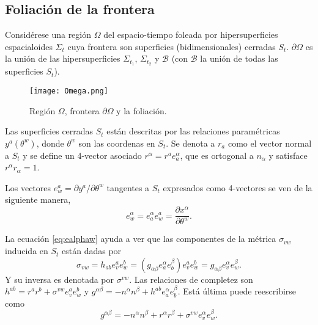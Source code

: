 
\subsection{Foliaci\'{o}n de la frontera}
\label{subsec:foliacionfrontera}

Consid\'{e}rese una regi\'{o}n $\Omega$ del espacio-tiempo foleada por hipersuperficies espacialoides $\Sigma_{t}$ cuya frontera son superficies (bidimensionales) cerradas $S_{t}$. $\partial \Omega$ es la uni\'{o}n de las hipersuperficies $\Sigma_{t_{1}}$, $\Sigma_{t_{2}}$ y $\mathcal{B}$ (con $\mathcal{B}$ la uni\'{o}n de todas las superficies $S_{t}$).

\begin{figure}[H]
\label{fig:OmegaandboundOmega}
\centering
\texttt{[image: Omega.png]}
\caption{Regi\'{o}n $\Omega$, frontera $\partial \Omega$ y la foliaci\'{o}n.}
\end{figure}

Las superficies cerradas $S_{t}$ est\'{a}n descritas por las relaciones param\'{e}tricas $y^{a} (\theta^{w})$, donde $\theta^{w}$ son las coordenas en $S_{t}$. Se denota a $r_{a}$ como el vector normal a $S_{t}$ y se define un 4-vector asociado $r^{\alpha} = r^{a} e^{\alpha}_{a}$, que es ortogonal a $n_{\alpha}$ y satisface $r^{\alpha} r_{\alpha} = 1$.

Los vectores $e^{a}_{w} = \partial y^{a} / \partial \theta^{w}$ tangentes a $S_{t}$ expresados como 4-vectores se ven de la siguiente manera,
%
\begin{equation}
\label{eq:ealphaw}
e^{\alpha}_{w} = e^{\alpha}_{a} e^{a}_{w} = \frac{\partial x^{\alpha}}{\partial \theta^{w}}.
\end{equation}

La ecuaci\'{o}n \eqref{eq:ealphaw} ayuda a ver que las componentes de la m\'{e}trica $\sigma_{vw}$ inducida en $S_{t}$ est\'{a}n dadas por
%
\begin{equation}
\label{eq:metricSt}
\sigma_{vw} = h_{ab} e^{a}_{v} e^{b}_{w}
= (g_{\alpha \beta} e^{\alpha}_{a} e^{\beta}_{b}) e^{a}_{v} e^{b}_{w}
= g_{\alpha \beta} e^{\alpha}_{v} e^{\beta}_{w}.
\end{equation}
%
Y su inversa es denotada por $\sigma^{vw}$. Las relaciones de completez son $h^{ab} = r^{a} r^{b} + \sigma^{vw} e^{a}_{v} e^{b}_{w}$ y $g^{\alpha \beta} = -n^{\alpha} n^{\beta} + h^{ab} e^{\alpha}_{a} e^{\beta}_{b}$. Est\'{a} \'{u}ltima puede reescribirse como
%
\begin{equation}
\label{eq:complt}
g^{\alpha \beta} = -n^{\alpha} n^{\beta} + r^{\alpha} r^{\beta} + \sigma^{vw} e^{\alpha}_{v} e^{\beta}_{w}.
\end{equation}

